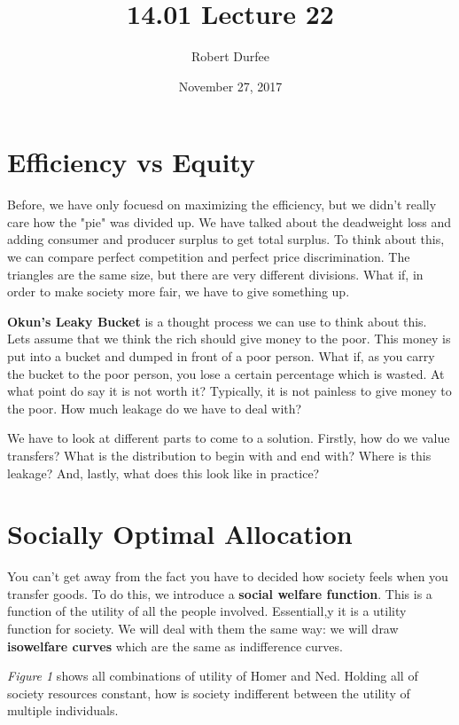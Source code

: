 \documentclass{article}
\title{ 14.01 Lecture 22 }
\author{ Robert Durfee }
\date{ November 27, 2017 }
\begin{document}
\maketitle

\section{ Efficiency vs Equity }

Before, we have only focuesd on maximizing the efficiency, but we didn't really
care how the "pie" was divided up. We have talked about the deadweight loss and
adding consumer and producer surplus to get total surplus. To think about this,
we can compare perfect competition and perfect price discrimination. The
triangles are the same size, but there are very different divisions. What if, in
order to make society more fair, we have to give something up. 

\textbf{Okun's Leaky Bucket} is a thought process we can use to think about
this. Lets assume that we think the rich should give money to the poor. This
money is put into a bucket and dumped in front of a poor person. What if, as you
carry the bucket to the poor person, you lose a certain percentage which is
wasted. At what point do say it is not worth it? Typically, it is not painless
to give money to the poor. How much leakage do we have to deal with?

We have to look at different parts to come to a solution. Firstly, how do we
value transfers? What is the distribution to begin with and end with? Where is
this leakage? And, lastly, what does this look like in practice?

\section{ Socially Optimal Allocation }

You can't get away from the fact you have to decided how society feels when you
transfer goods. To do this, we introduce a \textbf{social welfare function}.
This is a function of the utility of all the people involved. Essentiall,y it is
a utility function for society. We will deal with them the same way: we will
draw \textbf{isowelfare curves} which are the same as indifference curves. 

\textit{Figure 1} shows all combinations of utility of Homer and Ned. Holding
all of society resources constant, how is society indifferent between the
utility of multiple individuals.
\end{document}
